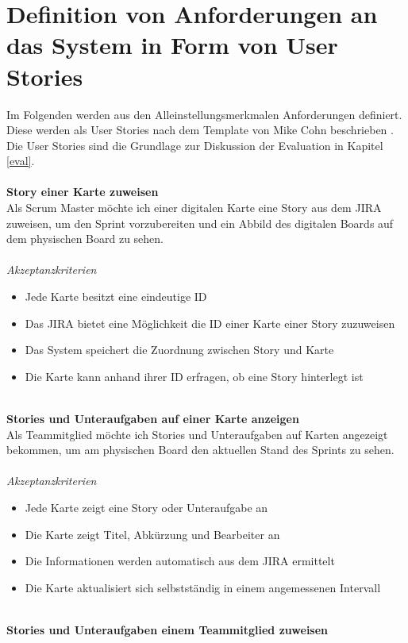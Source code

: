 \documentclass[12pt,titlepage]{scrartcl}
\begin{document}
	\section{Definition von Anforderungen an das System in Form von User Stories} \label{stories}
	Im Folgenden werden aus den Alleinstellungsmerkmalen Anforderungen definiert. Diese werden als User Stories nach dem Template von Mike Cohn beschrieben \cite{template}. Die User Stories sind die Grundlage zur Diskussion der Evaluation in Kapitel \ref{eval}. \\ \\
	\textbf{Story einer Karte zuweisen} \\
	Als Scrum Master möchte ich einer digitalen Karte eine Story aus dem JIRA zuweisen, um den Sprint vorzubereiten und ein Abbild des digitalen Boards auf dem physischen Board zu sehen. \\ \\
	\textit{Akzeptanzkriterien}
	\begin{itemize}
		\setlength\itemsep{0em}
		\item Jede Karte besitzt eine eindeutige ID
		\item Das JIRA bietet eine Möglichkeit die ID einer Karte einer Story zuzuweisen
		\item Das System speichert die Zuordnung zwischen Story und Karte
		\item Die Karte kann anhand ihrer ID erfragen, ob eine Story hinterlegt ist
	\end{itemize}
	\noindent
	\\ \textbf{Stories und Unteraufgaben auf einer Karte anzeigen} \\
	Als Teammitglied möchte ich Stories und Unteraufgaben auf Karten angezeigt bekommen, um am physischen Board den aktuellen Stand des Sprints zu sehen. \\ \\
	\textit{Akzeptanzkriterien}
	\begin{itemize}
		\setlength\itemsep{0em}
		\item Jede Karte zeigt eine Story oder Unteraufgabe an
		\item Die Karte zeigt Titel, Abkürzung und Bearbeiter an
		\item Die Informationen werden automatisch aus dem JIRA ermittelt
		\item Die Karte aktualisiert sich selbstständig in einem angemessenen Intervall
	\end{itemize}
	\noindent
	\\ \textbf{Stories und Unteraufgaben einem Teammitglied zuweisen} \\
\end{document}
